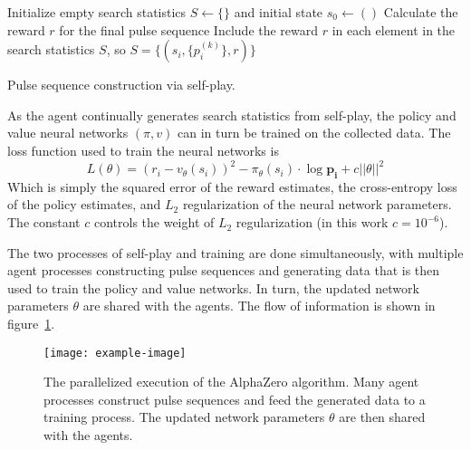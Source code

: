 \begin{algorithm}[H]
\BlankLine
Initialize empty search statistics $S \leftarrow \{\}$
and initial state $s_0 \leftarrow ()$
\;
Calculate the reward $r$ for the final pulse sequence \;
Include the reward $r$ in each element in the search statistics $S$, so $S = \{ (s_i, \{p_i^{(k)}\}, r) \}$ \;
\caption{Pulse sequence construction via self-play. \label{al:make_sequence}}
\end{algorithm}

As the agent continually generates search statistics from self-play, the policy and value neural networks $(\pi, v)$ can in turn be trained on the collected data. The loss function used to train the neural networks is
\begin{equation}\label{eq:az_loss}
    L(\theta) = (r_i - v_\theta(s_i))^2 - \pi_\theta(s_i) \cdot \log \mathbf{p_i} + c ||\theta||^2
\end{equation}
Which is simply the squared error of the reward estimates, the cross-entropy loss of the policy estimates, and $L_2$ regularization of the neural network parameters. The constant $c$ controls the weight of $L_2$ regularization (in this work $c = 10^{-6}$).

The two processes of self-play and training are done simultaneously, with multiple agent processes constructing pulse sequences and generating data that is then used to train the policy and value networks. In turn, the updated network parameters $\theta$ are shared with the agents. The flow of information is shown in figure~\ref{fig:az-parallel}.


\begin{figure}
    \centering
    \texttt{[image: example-image]}
    \caption{The parallelized execution of the AlphaZero algorithm. Many agent processes construct pulse sequences and feed the generated data to a training process. The updated network parameters $\theta$ are then shared with the agents.}
    \label{fig:az-parallel}
\end{figure}


